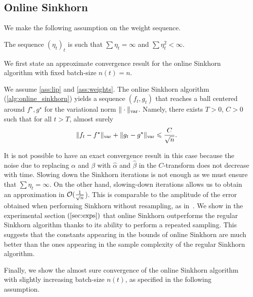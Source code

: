 \subsection{Online Sinkhorn}

We make the following \citet{robbins1951stochastic} assumption on the weight sequence.

\begin{assumption}\label{ass:weights}
    The sequence ${(\eta_t)}_t$ is such that
    $\sum \eta_t = \infty$ and $\sum \eta_t^2 < \infty$.
\end{assumption}


We first state an approximate convergence result for the online Sinkhorn algorithm with fixed batch-size $n(t) = n$.

\begin{proposition}\label{prop:convergence_bis}
    We assume \autoref{ass:lip} and \ref{ass:weights}. The online Sinkhorn algorithm (\autoref{alg:online_sinkhorn}) yields a sequence $(f_t, g_t)$ that reaches a
    ball centered around $f^\star, g^\star$ for the variational norm $\Vert
    \cdot \Vert_{\text{\upshape var}}$.
     Namely, there exists $T > 0$, $C > 0$ such that for all $t > T$, almost surely
    \begin{equation}
        \Vert f_t - f^\star \Vert_{\text{\upshape var}}
        + \Vert g_t - g^\star \Vert_{\text{\upshape var}} 
        \leqslant \frac{C}{\sqrt{n}} .
    \end{equation}
\end{proposition}

It is not possible to have an exact convergence result in this case because the noise due
to replacing $\alpha$ and $\beta$ with $\hat \alpha$ and $\hat \beta$ in the
$C$-transform does not decrease with time. Slowing down the Sinkhorn
iterations is not enough as we must ensure that $\sum \eta_t = \infty$. On the
other hand, slowing-down iterations allows us to obtain an approximation in
$\mathcal{O}(\frac{1}{\sqrt{n}}$). This is comparable to the amplitude of the error obtained when
performing Sinkhorn without resampling, as in~\citep{2019-Genevay-aistats}.  We show in
the experimental section $(\autoref{sec:exps})$ that online Sinkhorn 
outperforms the regular Sinkhorn algorithm thanks to its ability to perform a repeated sampling. 
%
This suggests that the constants appearing in the bounds of online Sinkhorn are much
better than the ones appearing in the sample complexity of the regular Sinkhorn
algorithm.

Finally, we show the almost sure convergence of the online Sinkhorn algorithm
with slightly increasing batch-size $n(t)$, as specified in the following
assumption.

